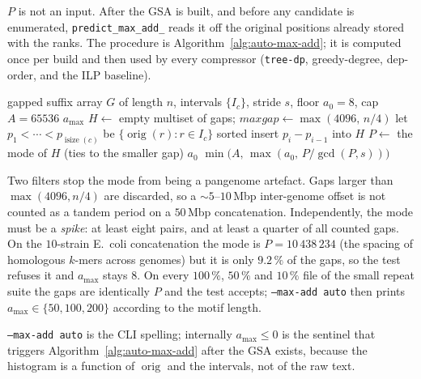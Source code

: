 \documentclass[11pt,a4paper]{article}
\theoremstyle{definition}
\theoremstyle{plain}
\theoremstyle{remark}
\newcommand{\orig}{\operatorname{orig}}
\newcommand{\isize}{\operatorname{isize}}
\begin{document}
$P$ is not an input. After the GSA is built, and before any candidate
is enumerated, \texttt{predict\_max\_add\_} reads it off the original
positions already stored with the ranks. The procedure is
Algorithm~\ref{alg:auto-max-add}; it is computed once per build and
then used by every compressor (\texttt{tree-dp}, greedy-degree,
dep-order, and the ILP baseline).

\begin{algorithm}[H]
\caption{Predict $a_{\max}$ from orig-position gaps
  (\texttt{predict\_max\_add\_})}
\label{alg:auto-max-add}
\begin{algorithmic}[1]
\Require gapped suffix array $G$ of length $n$, intervals $\{I_c\}$,
  stride $s$, floor $a_0=8$, cap $A=65536$
\Ensure $a_{\max}$
\State $H \gets$ empty multiset of gaps; $\mathit{maxgap} \gets
  \max(4096,\, n/4)$
\ForAll{names $c$ with $\isize(c) \ge \kappa$}
  \State let $p_1 < \cdots < p_{\isize(c)}$ be $\{\orig(r) : r\in I_c\}$
    sorted
  \For{$i = 2$ \textbf{to} $\isize(c)$}
      \State insert $p_i - p_{i-1}$ into $H$
    \EndIf
  \EndFor
\EndFor
\State $P \gets$ the mode of $H$ (ties to the smaller gap)
  \State \Return $a_0$
\EndIf
\State \Return $\min\bigl(A,\, \max(a_0,\, P/\gcd(P,s))\bigr)$
\end{algorithmic}
\end{algorithm}

Two filters stop the mode from being a pangenome artefact. Gaps larger
than $\max(4096, n/4)$ are discarded, so a $\sim 5$--$10$\,Mbp
inter-genome offset is not counted as a tandem period on a
$50$\,Mbp concatenation. Independently, the mode must be a
\emph{spike}: at least eight pairs, and at least a quarter of all
counted gaps. On the $10$-strain E.\ coli concatenation the mode is
$P = 10\,438\,234$ (the spacing of homologous $k$-mers across
genomes) but it is only $9.2\,\%$ of the gaps, so the test refuses it
and $a_{\max}$ stays $8$. On every $100\,\%$, $50\,\%$ and $10\,\%$
file of the small repeat suite the gaps are identically $P$ and the
test accepts; \texttt{--max-add auto} then prints
$a_{\max} \in \{50,100,200\}$ according to the motif length.

\texttt{--max-add auto} is the CLI spelling; internally $a_{\max}\le 0$
is the sentinel that triggers Algorithm~\ref{alg:auto-max-add} after
the GSA exists, because the histogram is a function of $\orig$ and
the intervals, not of the raw text.
\end{document}
